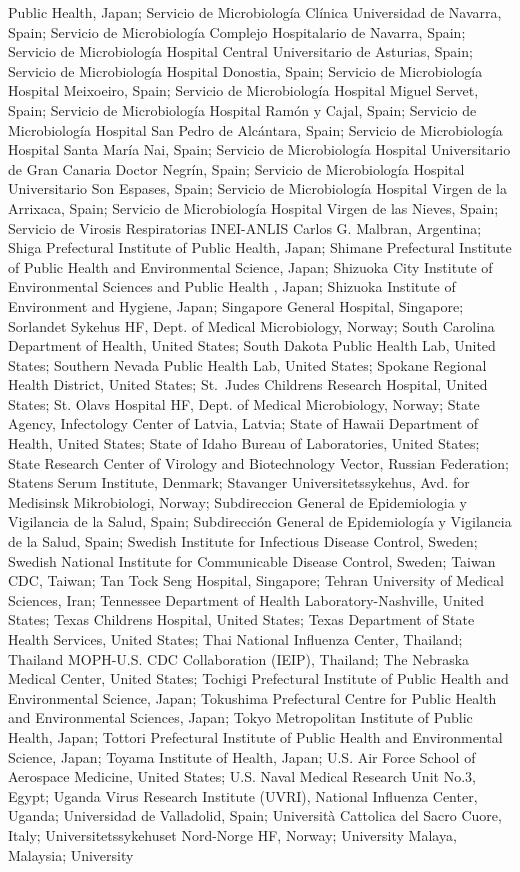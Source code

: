 \begin{appendixbox}
Public Health, Japan; Servicio de Microbiología Clínica Universidad de Navarra, Spain; Servicio de Microbiología Complejo Hospitalario de Navarra, Spain; Servicio de Microbiología Hospital Central Universitario de Asturias, Spain; Servicio de Microbiología Hospital Donostia, Spain; Servicio de Microbiología Hospital Meixoeiro, Spain; Servicio de Microbiología Hospital Miguel Servet, Spain; Servicio de Microbiología Hospital Ramón y Cajal, Spain; Servicio de Microbiología Hospital San Pedro de Alcántara, Spain; Servicio de Microbiología Hospital Santa María Nai, Spain; Servicio de Microbiología Hospital Universitario de Gran Canaria Doctor Negrín, Spain; Servicio de Microbiología Hospital Universitario Son Espases, Spain; Servicio de Microbiología Hospital Virgen de la Arrixaca, Spain; Servicio de Microbiología Hospital Virgen de las Nieves, Spain; Servicio de Virosis Respiratorias INEI-ANLIS Carlos G. Malbran, Argentina; Shiga Prefectural Institute of Public Health, Japan; Shimane Prefectural Institute of Public Health and Environmental Science, Japan; Shizuoka City Institute of Environmental Sciences and Public Health , Japan; Shizuoka Institute of Environment and Hygiene, Japan; Singapore General Hospital, Singapore; Sorlandet Sykehus HF, Dept. of Medical Microbiology, Norway; South Carolina Department of Health, United States; South Dakota Public Health Lab, United States; Southern Nevada Public Health Lab, United States; Spokane Regional Health District, United States; St.\ Judes Childrens Research Hospital, United States; St. Olavs Hospital HF, Dept. of Medical Microbiology, Norway; State Agency, Infectology Center of Latvia, Latvia; State of Hawaii Department of Health, United States; State of Idaho Bureau of Laboratories, United States; State Research Center of Virology and Biotechnology Vector, Russian Federation; Statens Serum Institute, Denmark; Stavanger Universitetssykehus, Avd. for Medisinsk Mikrobiologi, Norway; Subdireccion General de Epidemiologia y Vigilancia de la Salud, Spain; Subdirección General de Epidemiología y Vigilancia de la Salud, Spain; Swedish Institute for Infectious Disease Control, Sweden; Swedish National Institute for Communicable Disease Control, Sweden; Taiwan CDC, Taiwan; Tan Tock Seng Hospital, Singapore; Tehran University of Medical Sciences, Iran; Tennessee Department of Health Laboratory-Nashville, United States; Texas Childrens Hospital, United States; Texas Department of State Health Services, United States; Thai National Influenza Center, Thailand; Thailand MOPH-U.S. CDC Collaboration (IEIP), Thailand; The Nebraska Medical Center, United States; Tochigi Prefectural Institute of Public Health and Environmental Science, Japan; Tokushima Prefectural Centre for Public Health and Environmental Sciences, Japan; Tokyo Metropolitan Institute of Public Health, Japan; Tottori Prefectural Institute of Public Health and Environmental Science, Japan; Toyama Institute of Health, Japan; U.S. Air Force School of Aerospace Medicine, United States; U.S. Naval Medical Research Unit No.3, Egypt; Uganda Virus Research Institute (UVRI), National Influenza Center, Uganda; Universidad de Valladolid, Spain; Università Cattolica del Sacro Cuore, Italy; Universitetssykehuset Nord-Norge HF, Norway; University Malaya, Malaysia; University 
\end{appendixbox}
